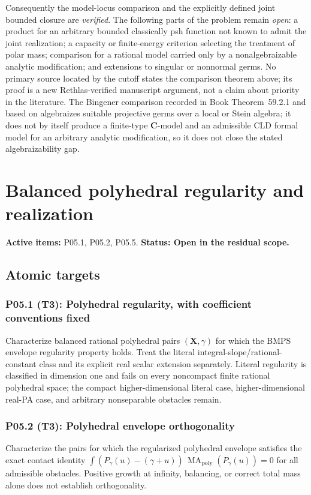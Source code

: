 \documentclass[11pt,a4paper]{article}
\theoremstyle{definition}
\theoremstyle{remark}
\DeclareMathOperator{\MA}{MA}
\begin{document}
Consequently the model-locus comparison and the explicitly defined joint
bounded closure are \emph{verified}.  The following parts of the problem
remain \emph{open}: a product for an arbitrary
bounded classically psh function not known to admit the joint realization; a
capacity or finite-energy criterion selecting the treatment of polar mass;
comparison for a rational model carried only by a nonalgebraizable analytic
modification; and extensions to singular or nonnormal germs.  No primary
source located by the cutoff states the comparison theorem above; its proof
is a new Rethlas-verified manuscript argument, not a claim about priority in
the literature.  The Bingener comparison recorded in
Book Theorem~59.2.1 and based on
\cite[Aussage~2.8]{Bingener76Stein} algebraizes suitable projective germs over
a local or Stein algebra; it does not by itself produce a finite-type
\(\mathbf C\)-model and an admissible CLD formal model for an arbitrary
analytic modification, so it does not close the stated algebraizability gap.

\clearpage\section{Balanced polyhedral regularity and realization}
\label{family:4}
\noindent\textbf{Active items:} P05.1, P05.2, P05.5. \textbf{Status: Open in the residual scope.}

\subsection{Atomic targets}
\subsubsection*{P05.1 (T3): Polyhedral regularity, with coefficient conventions fixed}
\label{atom:P05.1}
Characterize balanced rational polyhedral pairs \((\mathbf X,\gamma)\) for which the BMPS envelope regularity property holds. Treat the literal integral-slope/rational-constant class and its explicit real scalar extension separately. Literal regularity is classified in dimension one and fails on every noncompact finite rational polyhedral space; the compact higher-dimensional literal case, higher-dimensional real-PA case, and arbitrary nonseparable obstacles remain.

\subsubsection*{P05.2 (T3): Polyhedral envelope orthogonality}
\label{atom:P05.2}
Characterize the pairs for which the regularized polyhedral envelope satisfies the exact contact identity \(\int(P_\gamma(u)-(\gamma+u))\,\MA_{\mathrm{poly}}(P_\gamma(u))=0\) for all admissible obstacles. Positive growth at infinity, balancing, or correct total mass alone does not establish orthogonality.
\end{document}
